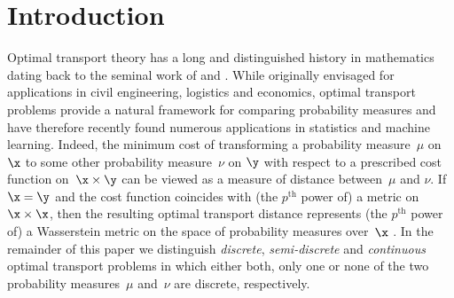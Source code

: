 \documentclass[11pt, a4paper, oneside, reqno]{article}
\begin{document}
	\section{Introduction}
	Optimal transport theory has a long and distinguished history in mathematics dating back to the seminal work of \citet{monge1781memoire} and \citet{kantorovich1942transfer}. While originally envisaged for applications in civil engineering, logistics and economics, optimal transport problems provide a natural framework for comparing probability measures and have therefore recently found numerous applications in statistics and machine learning. Indeed, the minimum cost of transforming a probability measure~$\mu$ on $\x$ to some other probability measure~$\nu$ on $\y$ with respect to a prescribed cost function on~$\x\times \y$ can be viewed as a measure of distance between~$\mu$ and $\nu$. If $\x=\y$ and the cost function coincides with (the $p^{\text{th}}$ power of) a metric on~$\x\times \x$, then the resulting optimal transport distance represents (the $p^{\text{th}}$ power of) a Wasserstein metric on the space of probability measures over~$\x$ \citep{villani}. In the remainder of this paper we distinguish {\em discrete}, {\em semi-discrete} and {\em continuous} optimal transport problems in which either both, only one or none of the two probability measures~$\mu$ and~$\nu$ are discrete, respectively.
	
	
	
\end{document}
